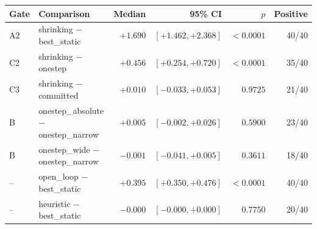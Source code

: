 \begin{tabular}{llrrrr}
\toprule
Gate & Comparison & Median & 95\% CI & $p$ & Positive \\
\midrule
A2 & shrinking $-$ best\_static & $+1.690$ & $[+1.462, +2.368]$ & ${<}0.0001$ & 40/40 \\
C2 & shrinking $-$ onestep & $+0.456$ & $[+0.254, +0.720]$ & ${<}0.0001$ & 35/40 \\
C3 & shrinking $-$ committed & $+0.010$ & $[-0.033, +0.053]$ & $0.9725$ & 21/40 \\
B & onestep\_absolute $-$ onestep\_narrow & $+0.005$ & $[-0.002, +0.026]$ & $0.5900$ & 23/40 \\
B & onestep\_wide $-$ onestep\_narrow & $-0.001$ & $[-0.041, +0.005]$ & $0.3611$ & 18/40 \\
\midrule
-- & open\_loop $-$ best\_static & $+0.395$ & $[+0.350, +0.476]$ & ${<}0.0001$ & 40/40 \\
-- & heuristic $-$ best\_static & $-0.000$ & $[-0.000, +0.000]$ & $0.7750$ & 20/40 \\
\bottomrule
\end{tabular}
